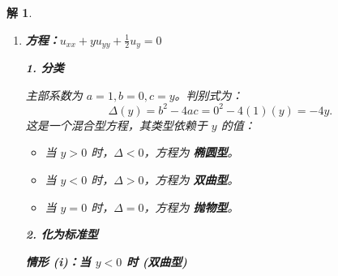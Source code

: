 \documentclass[12pt,a4paper]{article}
\newtheorem*{solution}{解}
\begin{document}
	\begin{solution}
		\begin{enumerate}[(1)]
			\item \textbf{方程：\( u_{xx} + y u_{yy} + \frac{1}{2} u_y = 0 \)}
			
			\textbf{1. 分类}
			
			主部系数为 \(a=1, b=0, c=y\)。判别式为：
			\[ \Delta(y) = b^2 - 4ac = 0^2 - 4(1)(y) = -4y. \]
			这是一个混合型方程，其类型依赖于 \(y\) 的值：
			\begin{itemize}
				\item 当 \(y > 0\) 时，\(\Delta < 0\)，方程为 \textbf{椭圆型}。
				\item 当 \(y < 0\) 时，\(\Delta > 0\)，方程为 \textbf{双曲型}。
				\item 当 \(y = 0\) 时，\(\Delta = 0\)，方程为 \textbf{抛物型}。
			\end{itemize}
			
			\textbf{2. 化为标准型}
			
			\textbf{情形 (i)：当 \(y < 0\) 时 (双曲型)}
			

\end{enumerate}
\end{solution}
\end{document}
